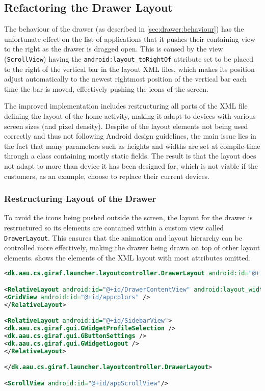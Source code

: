 \subsection{Refactoring the Drawer Layout}
The behaviour of the drawer (as described in \cref{sec:drawer:behaviour}) has the unfortunate effect on the list of applications that it pushes their containing view to the right as the drawer is dragged open.
This is caused by the view (\lstinline|ScrollView|) having the  \lstinline{android:layout_toRightOf} attribute set to be placed to the right of the vertical bar in the layout XML files, which makes its position adjust automatically to the newest rightmost position of the vertical bar each time the bar is moved, effectively pushing the icons of the screen.

The improved implementation includes restructuring all parts of the XML file defining the layout of the home activity, making it adapt to devices with various screen sizes (and pixel density).
Despite of the layout elements not being used correctly and thus not following Android design guidelines, the main issue lies in the fact that many parameters such as heights and widths are set at compile-time through a class containing mostly static fields.
The result is that the layout does not adapt to more than device it has been designed for, which is not viable if the customers, as an example, choose to replace their current devices.

\subsubsection{Restructuring Layout of the Drawer}\label{sec:sidebarlayout:xml}
To avoid the icons being pushed outside the screen, the layout for the drawer is restructured so its elements are contained within a custom view called \lstinline|DrawerLayout|.
This ensures that the animation and layout hierarchy can be controlled more effectively, making the drawer being drawn on top of other layout elements.
 shows the elements of the XML layout with most attributes omitted.

\begin{lstlisting}[caption={Structure of the XML layout of the drawer.},label={lst:sidebarlayout}, language=XML]
<dk.aau.cs.giraf.launcher.layoutcontroller.DrawerLayout android:id="@+id/DrawerView" android:layout_marginLeft="-400dp">

<RelativeLayout android:id="@+id/DrawerContentView" android:layout_width="400dp">
<GridView android:id="@+id/appcolors" />
</RelativeLayout>

<RelativeLayout android:id="@+id/SidebarView">
<dk.aau.cs.giraf.gui.GWidgetProfileSelection />
<dk.aau.cs.giraf.gui.GButtonSettings />
<dk.aau.cs.giraf.gui.GWidgetLogout />
</RelativeLayout>

</dk.aau.cs.giraf.launcher.layoutcontroller.DrawerLayout>

<ScrollView android:id="@+id/appScrollView"/>
\end{lstlisting}


